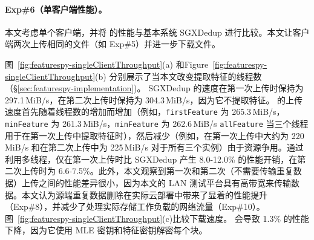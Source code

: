 \paragraph*{Exp\#6（单客户端性能）。}
本文考虑单个客户端，并将 \prototype 的性能与基本系统 SGXDedup 进行比较。本文让客户端两次上传相同的文件（如 Exp\#5）并进一步下载文件。


图~\ref{fig:featurespy-singleClientThroughput}(a) 和Figure~\ref{fig:featurespy-singleClientThroughput}(b) 分别展示了当本文改变提取特征的线程数（\S\ref{sec:featurespy-implementation})。 SGXDedup 的速度在第一次上传时保持为 297.1\,MiB/s，在第二次上传时保持为 304.3\,MiB/s，因为它不提取特征。 \prototype 的上传速度首先随着线程数的增加而增加（例如，{\tt firstFeature} 为 265.3\,MiB/s，{\tt minFeature} 为 261.3\,MiB/s，{\tt minFeature} 为 262.6\,MiB/s {\tt allFeature} 当三个线程用于在第一次上传中提取特征时），然后减少（例如，在第一次上传中大约为 220\,MiB/s 和在第二次上传中为 225\,MiB/s 对于所有三个实例）由于资源争用。通过利用多线程，\prototype 仅在第一次上传时比 SGXDedup 产生 8.0-12.0\% 的性能开销，在第二次上传时为 6.6-7.5\%。此外，本文观察到第一次和第二次（不需要传输重复数据）上传之间的性能差异很小，因为本文的 LAN 测试平台具有高带宽来传输数据。本文认为源端重复数据删除在实际云部署中带来了显着的性能提升（Exp\#8），并减少了处理实际存储工作负载的网络流量（Exp\#10）。图~\ref{fig:featurespy-singleClientThroughput}(c)比较下载速度。 \prototype 会导致 1.3\% 的性能下降，因为它使用 MLE 密钥和特征密钥解密每个块。


